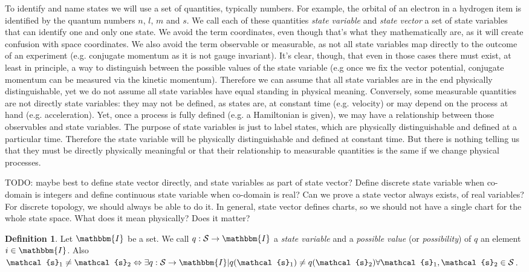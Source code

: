 \documentclass[aps,pra,10pt,twocolumn,floatfix,nofootinbib]{revtex4-1}
\theoremstyle{definition}
\newtheorem{defn}[prop]{Definition}
\begin{document}
To identify and name states we will use a set of quantities, typically numbers. For example, the orbital of an electron in a hydrogen item is identified by the quantum numbers $n$, $l$, $m$ and $s$. We call each of these quantities \emph{state variable} and \emph{state vector} a set of state variables that can identify one and only one state. We avoid the term coordinates, even though that's what they mathematically are, as it will create confusion with space coordinates. We also avoid the term observable or measurable, as not all state variables map directly to the outcome of an experiment (e.g. conjugate momentum as it is not gauge invariant). It's clear, though, that even in those cases there must exist, at least in principle, a way to distinguish between the possible values of the state variable (e.g once we fix the vector potential, conjugate momentum can be measured via the kinetic momentum). Therefore we can assume that all state variables are in the end physically distinguishable, yet we do not assume all state variables have equal standing in physical meaning. Conversely, some measurable quantities are not directly state variables: they may not be defined, as states are, at constant time (e.g. velocity) or may depend on the process at hand (e.g. acceleration). Yet, once a process is fully defined (e.g. a Hamiltonian is given), we may have a relationship between those observables and state variables. The purpose of state variables is just to label states, which are physically distinguishable and defined at a particular time. Therefore the state variable will be physically distinguishable and defined at constant time. But there is nothing telling us that they must be directly physically meaningful or that their relationship to measurable quantities is the same if we change physical processes.

TODO: maybe best to define state vector directly, and state variables as part of state vector? Define discrete state variable when co-domain is integers and define continuous state variable when co-domain is real? Can we prove a state vector always exists, of real variables? For discrete topology, we should always be able to do it. In general, state vector defines charts, so we should not have a single chart for the whole state space. What does it mean physically? Does it matter?

\begin{defn}\label{state_variable}
Let $\mathbbm{I}$ be a set. We call $q : \mathcal{S} \rightarrow \mathbbm{I}$ a \emph{state variable} and a \emph{possible value} (or \emph{possibility}) of $q$ an element $i \in \mathbbm{I}$. Also $\mathcal{s}_1 \neq \mathcal{s}_2 \Leftrightarrow \exists q : \mathcal{S} \rightarrow \mathbbm{I} | q(\mathcal{s}_1)\neq q(\mathcal{s}_2) \forall \mathcal{s}_1, \mathcal{s}_2 \in \mathcal{S}$.
\end{defn}
\end{document}

